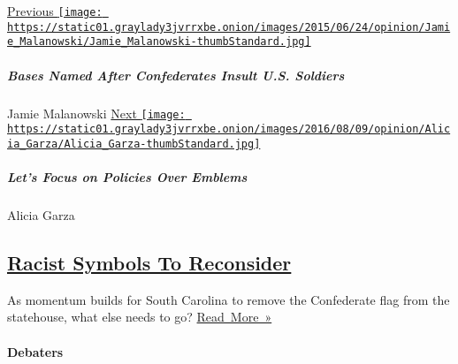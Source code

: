 \href{bases-named-after-confederates-are-an-insult-to-us-soldiers}{Previous
\texttt{[image: https://static01.graylady3jvrrxbe.onion/images/2015/06/24/opinion/Jamie\_Malanowski/Jamie\_Malanowski-thumbStandard.jpg]}}

\hypertarget{bases-named-after-confederates-insult-us-soldiers}{%
\subparagraph{Bases Named After Confederates Insult U.S.
Soldiers}\label{bases-named-after-confederates-insult-us-soldiers}}

Jamie Malanowski
\href{lets-focus-instead-policies-that-enforce-structural-racism}{Next
\texttt{[image: https://static01.graylady3jvrrxbe.onion/images/2016/08/09/opinion/Alicia\_Garza/Alicia\_Garza-thumbStandard.jpg]}}

\hypertarget{lets-focus-on-policies-over-emblems}{%
\subparagraph{Let's Focus on Policies Over
Emblems}\label{lets-focus-on-policies-over-emblems}}

Alicia Garza

\hypertarget{racist-symbols-to-reconsider}{%
\subsection{\texorpdfstring{\href{../besides-the-confederate-flag-what-other-symbols-should-go}{Racist
Symbols To
Reconsider}}{Racist Symbols To Reconsider}}\label{racist-symbols-to-reconsider}}

As momentum builds for South Carolina to remove the Confederate flag
from the statehouse, what else needs to go?
\href{../besides-the-confederate-flag-what-other-symbols-should-go}{Read~More~»}

\hypertarget{debaters}{%
\paragraph{Debaters}\label{debaters}}

